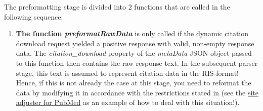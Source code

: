 \documentclass[
a4paper,
12pt,
]
{article}
\begin{document}
The preformatting stage is divided into 2 functions that are called in the following sequence:
\begin{enumerate}
 \item \textbf{The function \textit{preformatRawData}} is only called if the dynamic citation download request yielded a positive response with valid, non-empty response data. The \textit{citation\_download} property of the \textit{metaData} JSON-object passed to this function then contains the raw response text. In the subsequent parser stage, this text is assumed to represent citation data in the RIS-format! 
 Hence, if this is not already the case at this stage, you need to reformat the data by modifying it in accordance with the restrictions stated in  (see the \href{https://github.com/Langenscheiss/bibitnow/blob/master/background/preformatters/pubmed.js}{site adjuster for PubMed} as an example of how to deal with this situation!).
 

\end{enumerate}
\end{document}
